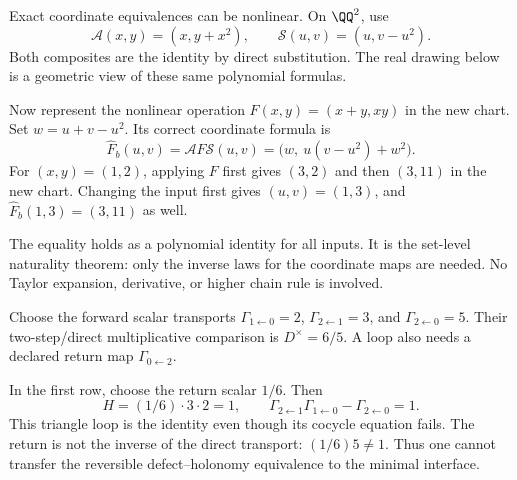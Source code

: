Exact coordinate equivalences can be nonlinear. On $\QQ^2$, use
\[
\mathcal A(x,y)=(x,y+x^2),\qquad
\mathcal S(u,v)=(u,v-u^2).
\]
Both composites are the identity by direct substitution. The real drawing below is a geometric view of these same polynomial formulas.


Now represent the nonlinear operation $F(x,y)=(x+y,xy)$ in the new chart. Set $w=u+v-u^2$. Its correct coordinate formula is
\[
\widehat F_b(u,v)=\mathcal A F\mathcal S(u,v)
=\bigl(w,\ u(v-u^2)+w^2\bigr).
\]
For $(x,y)=(1,2)$, applying $F$ first gives $(3,2)$ and then $(3,11)$ in the new chart. Changing the input first gives $(u,v)=(1,3)$, and $\widehat F_b(1,3)=(3,11)$ as well.

The equality holds as a polynomial identity for all inputs. It is the set-level naturality theorem: only the inverse laws for the coordinate maps are needed. No Taylor expansion, derivative, or higher chain rule is involved.


Choose the forward scalar transports $\Gamma_{1\leftarrow0}=2$, $\Gamma_{2\leftarrow1}=3$, and $\Gamma_{2\leftarrow0}=5$. Their two-step/direct multiplicative comparison is $D^\times=6/5$. A loop also needs a declared return map $\Gamma_{0\leftarrow2}$.


In the first row, choose the return scalar $1/6$. Then
\[
H=(1/6)\cdot3\cdot2=1,
\qquad \Gamma_{2\leftarrow1}\Gamma_{1\leftarrow0}-\Gamma_{2\leftarrow0}=1.
\]
This triangle loop is the identity even though its cocycle equation fails. The return is not the inverse of the direct transport: $(1/6)5\ne1$. Thus one cannot transfer the reversible defect--holonomy equivalence to the minimal interface.

